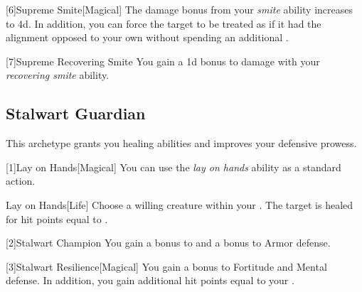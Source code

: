         [6]{Supreme Smite}[Magical] The damage bonus from your \textit{smite} ability increases to \plus4d.
        In addition, you can force the target to be treated as if it had the alignment opposed to your own without spending an additional .

        [7]{Supreme Recovering Smite} You gain a \plus1d bonus to damage with your \textit{recovering smite} ability.


    \subsection{Stalwart Guardian}
        This archetype grants you healing abilities and improves your defensive prowess.

        [1]{Lay on Hands}[Magical] You can use the \textit{lay on hands} ability as a standard action.
        \begin{freeability}{Lay on Hands}[Life]
            Choose a willing creature within your .
            The target is healed for hit points equal to .
        \end{freeability}

        [2]{Stalwart Champion}
        You gain a  bonus to  and a  bonus to Armor defense.

        [3]{Stalwart Resilience}[Magical]
        You gain a  bonus to Fortitude and Mental defense.
        In addition, you gain additional hit points equal to your .

